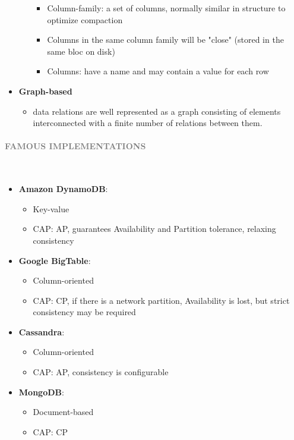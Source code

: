 \documentclass[10pt,a4paper]{article}
\newcommand{\myparagraph}[1]{\paragraph{\normalsize{\textcolor{gray}{\uppercase{\textbf{#1}}}} }\mbox{} \vspace{0.5em}\\}
\begin{document}
\begin{justify}
\begin{itemize}
\begin{itemize}
\begin{itemize}
			\item Column-family: a set of columns, normally similar in structure to optimize compaction
			\item Columns in the same column family will be "close" (stored in the same bloc on disk)
			\item Columns: have a name and may contain a value for each row
		\end{itemize}
	\end{itemize}
	\item \textbf{Graph-based}
	 \begin{itemize}
	 	\item data relations are well represented as a graph consisting of elements interconnected with a finite number of relations between them.
	 \end{itemize}
\end{itemize}
\myparagraph{Famous Implementations}
\begin{itemize}
	\item \textbf{Amazon DynamoDB}:
	\begin{itemize}
		\item Key-value
		\item CAP: AP, guarantees Availability and Partition tolerance, relaxing consistency
	\end{itemize}
	\item \textbf{Google BigTable}:
	\begin{itemize}
		\item Column-oriented
		\item CAP: CP, if there is a network partition, Availability is lost, but strict consistency may be required
	\end{itemize}
	\item \textbf{Cassandra}:
	\begin{itemize}
		\item Column-oriented
		\item CAP: AP, consistency is configurable
	\end{itemize}
	\item \textbf{MongoDB}:
	\begin{itemize}
		\item Document-based
		\item CAP: CP
	\end{itemize}
\end{itemize}

\end{justify}
\end{document}
